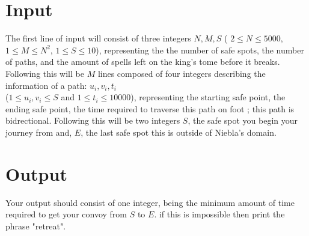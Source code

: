 \section*{Input}

\noindent The first line of input will consist of three integers $N, M, S$
( $2 \leq N \leq 5000$, $ 1 \leq M \leq N^2$, $1 \leq S \leq 10$), representing the the number of safe spots, the
number of paths, and the amount of spells left on the king's tome before it breaks. \\

\noindent Following this will be $M$ lines composed of four integers describing the information of a path:
$u_i, v_i, t_i$ \\ ($1 \leq u_i,v_i \leq S$ and $1 \leq t_i \leq 10000$), representing the starting safe point,
the ending safe point, the time required to traverse this path on foot ; this path is bidrectional. Following this
will be two integers $S$, the safe spot you begin your journey from and, $E$, the last safe spot this is outside of
Niebla's domain. \\

\section*{Output}

Your output should consist of one integer, being the minimum amount of time required to get your convoy from $S$ to
$E$. if this is impossible then print the phrase "retreat".
